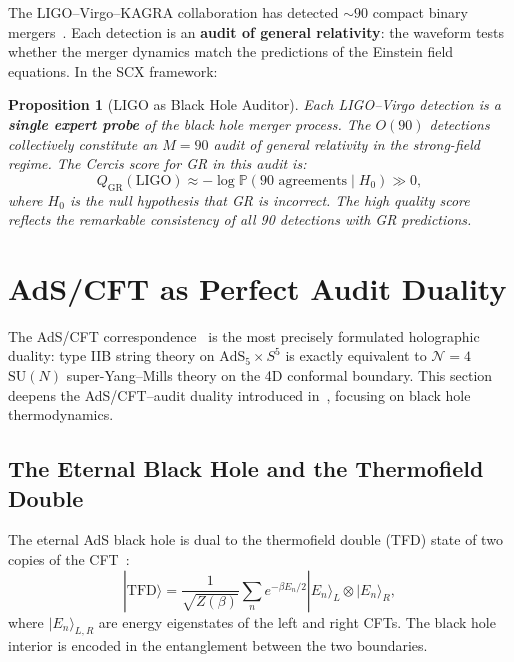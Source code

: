 \documentclass[12pt,a4paper]{article}
\newtheorem{proposition}[theorem]{Proposition}
\theoremstyle{remark}
\newcommand{\Pbb}{\mathbb{P}}
\newcommand{\SCX}{\textsf{SCX}}
\newcommand{\Cercis}{\textsf{Cercis}}
\begin{document}
The LIGO--Virgo--KAGRA collaboration has detected $\sim 90$ compact binary mergers~\cite{abbott2021gwtc3}. Each detection is an \textbf{audit of general relativity}: the waveform tests whether the merger dynamics match the predictions of the Einstein field equations. In the \SCX{} framework:

\begin{proposition}[LIGO as Black Hole Auditor]
\label{prop:ligo_auditor}
Each LIGO--Virgo detection is a \textbf{single expert probe} of the black hole merger process. The $O(90)$ detections collectively constitute an $M = 90$ audit of general relativity in the strong-field regime. The \Cercis{} score for GR in this audit is:
\begin{equation}
  Q_{\text{GR}}(\text{LIGO}) \approx -\log \Pbb(\text{90 agreements} \mid H_0) \gg 0,
\end{equation}
where $H_0$ is the null hypothesis that GR is incorrect. The high quality score reflects the remarkable consistency of all 90 detections with GR predictions.
\end{proposition}


\section{AdS/CFT as Perfect Audit Duality}
\label{sec:adscft}

The AdS/CFT correspondence~\cite{maldacena1999large} is the most precisely formulated holographic duality: type IIB string theory on $\text{AdS}_5 \times S^5$ is exactly equivalent to $\mathcal{N} = 4$ $\text{SU}(N)$ super-Yang--Mills theory on the 4D conformal boundary. This section deepens the AdS/CFT--audit duality introduced in~\cite{scx_qg_audit}, focusing on black hole thermodynamics.

\subsection{The Eternal Black Hole and the Thermofield Double}

The eternal AdS black hole is dual to the thermofield double (TFD) state of two copies of the CFT~\cite{maldacena2003eternal}:
\begin{equation}
  |\text{TFD}\rangle = \frac{1}{\sqrt{Z(\beta)}} \sum_n e^{-\beta E_n / 2} |E_n\rangle_L \otimes |E_n\rangle_R,
\end{equation}
where $|E_n\rangle_{L,R}$ are energy eigenstates of the left and right CFTs. The black hole interior is encoded in the entanglement between the two boundaries.
\end{document}
